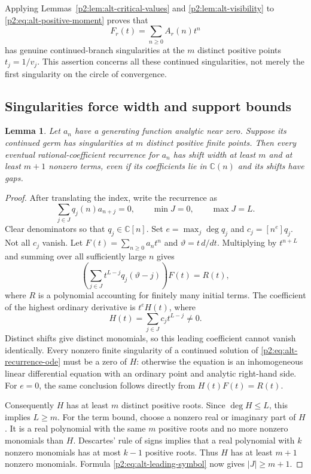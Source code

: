 \documentclass[11pt,a4paper]{article}
\newtheorem{lemma}[theorem]{Lemma}
\theoremstyle{definition}
\theoremstyle{remark}
\numberwithin{equation}{section}
\begin{document}
Applying Lemmas~\ref{p2:lem:alt-critical-values} and
\ref{p2:lem:alt-visibility} to \eqref{p2:eq:alt-positive-moment} proves that
\begin{equation}\label{p2:eq:alt-generating-function}
 F_r(t)=\sum_{n\geq0}A_r(n)t^n
\end{equation}
has genuine continued-branch singularities at the $m$ distinct positive
points $t_j=1/v_j$. This assertion concerns all these continued
singularities, not merely the first singularity on the circle of
convergence.

\subsection{Singularities force width and support bounds}

\begin{lemma}\label{p2:lem:alt-sparse-budget}
Let $a_n$ have a generating function analytic near zero. Suppose its
continued germ has singularities at $m$ distinct positive finite
points. Then every eventual rational-coefficient recurrence for $a_n$
has shift width at least $m$ and at least $m+1$ nonzero terms, even if
its coefficients lie in $\mathbb C(n)$ and its shifts have gaps.
\end{lemma}

\begin{proof}
After translating the index, write the recurrence as
\[
 \sum_{j\in J}q_j(n)a_{n+j}=0,
 \qquad \min J=0,\qquad \max J=L.
\]
Clear denominators so that $q_j\in\mathbb C[n]$. Set
$e=\max_j\deg q_j$ and $c_j=[n^e]q_j$. Not all $c_j$ vanish.
Let $F(t)=\sum_{n\geq0}a_nt^n$ and $\vartheta=t\,d/dt$.
Multiplying by $t^{n+L}$ and summing over all sufficiently large $n$
gives
\begin{equation}\label{p2:eq:alt-recurrence-ode}
 \left(\sum_{j\in J}t^{L-j}q_j(\vartheta-j)\right)F(t)=R(t),
\end{equation}
where $R$ is a polynomial accounting for finitely many initial terms.
The coefficient of the highest ordinary derivative is $t^eH(t)$,
where
\begin{equation}\label{p2:eq:alt-leading-symbol}
 H(t)=\sum_{j\in J}c_jt^{L-j}\ne0.
\end{equation}
Distinct shifts give distinct monomials, so this leading coefficient
cannot vanish identically. Every nonzero finite singularity of a
continued solution of \eqref{p2:eq:alt-recurrence-ode} must be a zero of
$H$: otherwise the equation is an inhomogeneous linear differential
equation with an ordinary point and analytic right-hand side. For
$e=0$, the same conclusion follows directly from $H(t)F(t)=R(t)$.

Consequently $H$ has at least $m$ distinct positive roots. Since
$\deg H\leq L$, this implies $L\geq m$.
For the term bound, choose a nonzero real or imaginary part of $H$.
It is a real polynomial with the same $m$ positive roots and no more
nonzero monomials than $H$. Descartes' rule of signs implies that a
real polynomial with $k$ nonzero monomials has at most $k-1$ positive
roots. Thus $H$ has at least $m+1$ nonzero monomials. Formula
\eqref{p2:eq:alt-leading-symbol} now gives $|J|\geq m+1$.
\end{proof}
\end{document}
